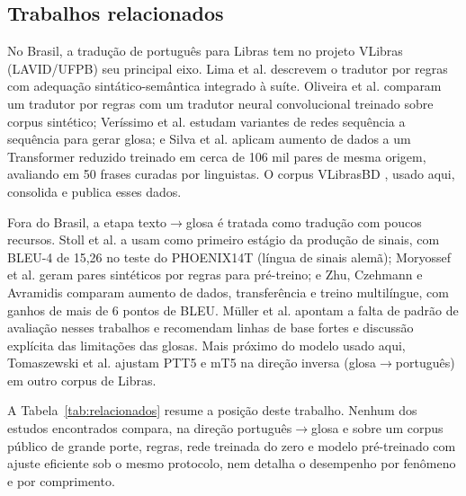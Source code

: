 \documentclass[12pt]{article}
\begin{document}
\subsection{Trabalhos relacionados}

No Brasil, a tradução de português para Libras tem no projeto VLibras (LAVID/UFPB) seu principal eixo. Lima et al. \cite{lima2022} descrevem o tradutor por regras com adequação sintático-semântica integrado à suíte. Oliveira et al. \cite{oliveira} comparam um tradutor por regras com um tradutor neural convolucional treinado sobre corpus sintético; Veríssimo et al. \cite{verissimo} estudam variantes de redes sequência a sequência para gerar glosa; e Silva et al. \cite{silva2024} aplicam aumento de dados a um Transformer reduzido treinado em cerca de 106 mil pares de mesma origem, avaliando em 50 frases curadas por linguistas. O corpus VLibrasBD \cite{lima2025,albuquerque,mendeley}, usado aqui, consolida e publica esses dados.

Fora do Brasil, a etapa texto$\to$glosa é tratada como tradução com poucos recursos. Stoll et al. \cite{stoll} a usam como primeiro estágio da produção de sinais, com BLEU-4 de 15,26 no teste do PHOENIX14T (língua de sinais alemã); Moryossef et al. \cite{moryossef} geram pares sintéticos por regras para pré-treino; e Zhu, Czehmann e Avramidis \cite{zhu} comparam aumento de dados, transferência e treino multilíngue, com ganhos de mais de 6 pontos de BLEU. Müller et al. \cite{muller} apontam a falta de padrão de avaliação nesses trabalhos e recomendam linhas de base fortes e discussão explícita das limitações das glosas. Mais próximo do modelo usado aqui, Tomaszewski et al. \cite{tomaszewski} ajustam PTT5 e mT5 na direção inversa (glosa$\to$português) em outro corpus de Libras.

A Tabela~\ref{tab:relacionados} resume a posição deste trabalho. Nenhum dos estudos encontrados compara, na direção português$\to$glosa e sobre um corpus público de grande porte, regras, rede treinada do zero e modelo pré-treinado com ajuste eficiente sob o mesmo protocolo, nem detalha o desempenho por fenômeno e por comprimento.
\end{document}

